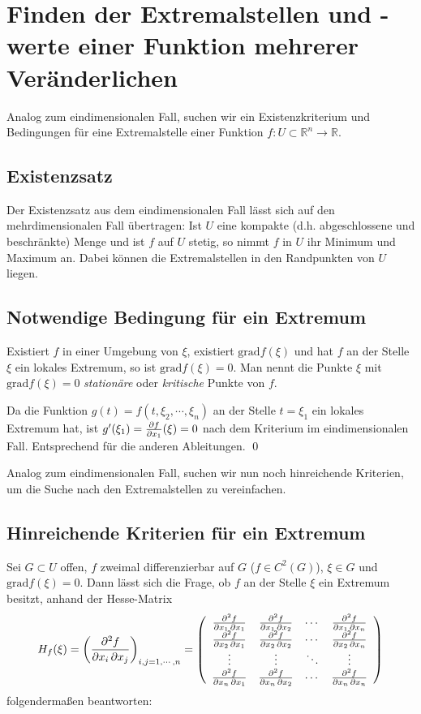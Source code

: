 \section{Finden der Extremalstellen und -werte einer Funktion mehrerer Veränderlichen}

Analog zum eindimensionalen Fall, suchen wir ein Existenzkriterium und Bedingungen für eine Extremalstelle einer Funktion
$f: U \subset \mathbb{R}^n \rightarrow \mathbb{R}$.

\subsection{Existenzsatz}

Der Existenzsatz aus dem eindimensionalen Fall lässt sich auf den mehrdimensionalen Fall übertragen:
Ist $U$ eine kompakte (d.h. abgeschlossene und beschränkte) Menge und ist $f$ auf $U$ stetig, so nimmt $f$ in $U$
ihr Minimum und Maximum an. Dabei können die Extremalstellen in den Randpunkten von $U$ liegen.

\subsection{Notwendige Bedingung für ein Extremum}

Existiert $f$ in einer Umgebung von $\xi$, existiert $\mathrm{grad} f(\xi)$ und hat $f$ an der Stelle $\xi$ ein lokales
Extremum, so ist $\mathrm{grad} f(\xi) = 0$. Man nennt die Punkte $\xi$ mit $\mathrm{grad} f(\xi) = 0$ {\it stationäre}
oder {\it kritische} Punkte von $f$.

\begin{beweis}
    Da die Funktion $g(t) = f(t, \xi_2, \cdots, \xi_n)$ an der Stelle $t = \xi_1$ ein lokales Extremum hat, ist $g'(\xi_1) = 
    \frac{\partial f}{\partial x_1}(\xi) = 0$ nach dem Kriterium im eindimensionalen Fall. Entsprechend für die anderen Ableitungen. \qed
\end{beweis}

Analog zum eindimensionalen Fall, suchen wir nun noch hinreichende Kriterien, um die Suche nach den Extremalstellen zu vereinfachen.

\subsection{Hinreichende Kriterien für ein Extremum}

Sei $G\subset U$ offen, $f$ zweimal differenzierbar auf $G$ ($f\in C^2(G)$), $\xi \in G$ und $\mathrm{grad} f(\xi) = 0$.
Dann lässt sich die Frage, ob $f$ an der Stelle $\xi$ ein Extremum besitzt, anhand der Hesse-Matrix
\[ H_f(\xi) = \left(\frac{\partial^2 f}{\partial x_i \, \partial x_j}\right)_{i,j = 1, \cdots, n} =
    \left( \begin{array}{cccc}
        \frac{\partial^2 f}{\partial x_1\,\partial x_1} & \frac{\partial^2 f}{\partial x_1\,\partial x_2} & \cdots & \frac{\partial^2 f}{\partial x_1\,\partial x_n} \\
        \frac{\partial^2 f}{\partial x_2\,\partial x_1} & \frac{\partial^2 f}{\partial x_2\,\partial x_2} & \cdots & \frac{\partial^2 f}{\partial x_2\,\partial x_n} \\
        \vdots & \vdots & \ddots & \vdots \\
        \frac{\partial^2 f}{\partial x_n\,\partial x_1} & \frac{\partial^2 f}{\partial x_n\,\partial x_2} & \cdots & \frac{\partial^2 f}{\partial x_n\,\partial x_n}
    \end{array} \right) \]
folgendermaßen beantworten:

